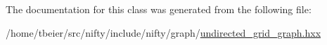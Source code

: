 The documentation for this class was generated from the following file\+:\begin{DoxyCompactItemize}
\item 
/home/tbeier/src/nifty/include/nifty/graph/\hyperlink{graph_2undirected__grid__graph_8hxx}{undirected\+\_\+grid\+\_\+graph.\+hxx}\end{DoxyCompactItemize}
